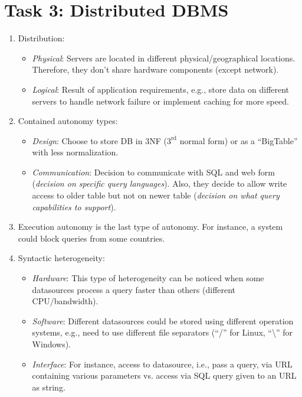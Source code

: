 \documentclass{scrartcl}
\begin{document}
	\section*{Task 3: Distributed DBMS}
	\begin{enumerate}
		\item Distribution:
		\begin{itemize}
			\item \textit{Physical}: Servers are located in different physical/geographical locations.
			Therefore, they don't share hardware components (except network).
			
			\item \textit{Logical}: Result of application requirements, e.g., store data on different servers to handle network failure or implement caching for more speed.
		\end{itemize}
	
		\item Contained autonomy types:
		\begin{itemize}
			\item \textit{Design}: Choose to store DB in 3NF ($3^{\text{rd}}$ normal form) or as a \enquote{BigTable} with less normalization.
			\item \textit{Communication}: Decision to communicate with SQL and web form (\textit{decision on specific query languages}).
			Also, they decide to allow write access to older table but not on newer table (\textit{decision on what query capabilities to support}).
		\end{itemize}
	
		\item Execution autonomy is the last type of autonomy.
		For instance, a system could block queries from some countries.
		
		\item Syntactic heterogeneity:
		\begin{itemize}
			\item \textit{Hardware}: This type of heterogeneity can be noticed when some datasources process a query faster than others (different CPU/bandwidth).
			
			\item \textit{Software}: Different datasources could be stored using different operation systems, e.g., need to use different file separators (\enquote{/} for Linux, \enquote{\textbackslash} for Windows).
			
			\item \textit{Interface}: For instance, access to datasource, i.e., pass a query, via URL containing various parameters vs. access via SQL query given to an URL as string.
		\end{itemize}
	

\end{enumerate}
\end{document}
